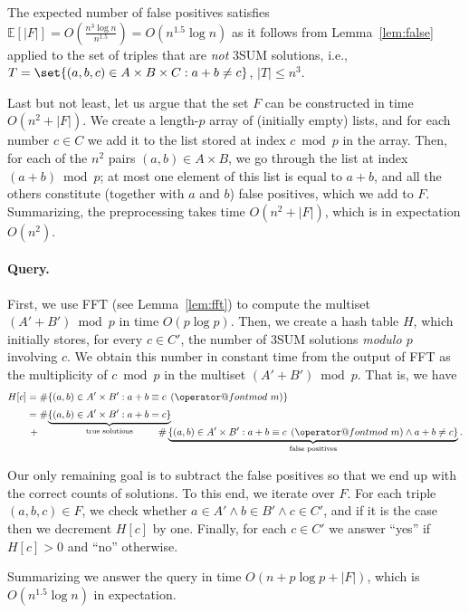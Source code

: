 \documentclass[10pt,a4paper]{article}
\makeatletter
\newcommand{\E}{\mathbb{E}}
\newcommand{\tpmod}[1]{\mkern 8mu({\operator@font mod}\mkern 6mu#1)}
\makeatother
\begin{document}
The expected number of false positives satisfies $\E[|F|] = O(\frac{n^3 \log n}{n^{1.5}}) = O(n^{1.5} \log n)$ as it follows from Lemma~\ref{lem:false} applied to the set of triples that are \emph{not} 3SUM solutions, i.e., $T=\set{(a,b,c) \in A \times B \times C : a + b \neq c}$, $|T| \leqslant n^3$.

Last but not least, let us argue that the set $F$ can be constructed in time $O(n^2+|F|)$. We create a length-$p$ array of (initially empty) lists, and for each number $c \in C$ we add it to the list stored at index $c \bmod p$ in the array. Then, for each of the $n^2$ pairs $(a,b) \in A \times B$, we go through the list at index $(a + b) \bmod p$; at most one element of this list is equal to $a+b$, and all the others constitute (together with $a$ and $b$) false positives, which we add to $F$.
Summarizing, the preprocessing takes time ${O}(n^2 + |F|)$, which is in expectation $O(n^2)$.

\paragraph{Query.}
First, we use FFT (see Lemma~\ref{lem:fft}) to compute the multiset $(A'+B') \bmod p$ in time $O(p \log p)$.
Then, we create a hash table $H$, which initially stores, for every $c \in C'$, the number of 3SUM solutions \emph{modulo $p$} involving $c$. We obtain this number in constant time from the output of FFT as the multiplicity of $c \bmod p$ in the multiset $(A'+B') \bmod p$. That is, we have
\begin{align*}
H[c] &= \#\{(a,b) \in A' \times B' : a + b \equiv c \tpmod{m}\} \\[.3em]
& = \#\smash{\underbrace{\{(a,b) \in A' \times B' : a+b=c\}}_{\text{true solutions}}} \\[.3em]
& \, + \hspace{12em}  \#\underbrace{\{(a,b) \in A' \times B' : a + b \equiv c \tpmod{m} \land a + b \neq c\}}_{\text{false positives}}.
\end{align*}

Our only remaining goal is to subtract the false positives so that we end up with the correct counts of solutions. To this end, we iterate over $F$. For each triple $(a,b,c) \in F$, we check whether $a \in A' \land b \in B' \land c \in C'$, and if it is the case then we decrement $H[c]$ by one.
Finally, for each $c \in C'$ we answer ``yes'' if $H[c] > 0$ and ``no'' otherwise.

Summarizing we answer the query in time $O(n + p \log p + |F|)$, which is $O(n^{1.5} \log n)$ in expectation.
\end{document}
